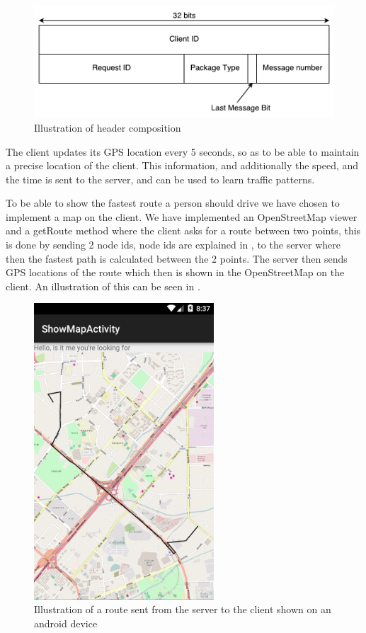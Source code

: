 \begin{figure}[h!]
  \centering
    \includegraphics[width=1\textwidth]{figures/bytesclientserver.pdf}
    \caption{Illustration of header composition}
    \label{fig:bytesclientserver}
\end{figure}

The client updates its GPS location every 5 seconds, so as to be able to maintain a precise location of the client. This information, and additionally the speed, and the time is sent to the server, and can be used to learn traffic patterns.

To be able to show the fastest route a person should drive we have chosen to implement a map on the client. We have implemented an OpenStreetMap viewer and a getRoute method where the client asks for a route between two points, this is done by sending 2 node ids, node ids are explained in , to the server where then the fastest path is calculated between the 2 points. The server then sends GPS locations of the route which then is shown in the OpenStreetMap on the client. An illustration of this can be seen in .

\begin{figure}[H]
  \centering
    \includegraphics[width=0.6\textwidth]{figures/routeOnMap.png}
    \caption{Illustration of a route sent from the server to the client shown on an android device}
    \label{fig:routeonmap}
\end{figure}
